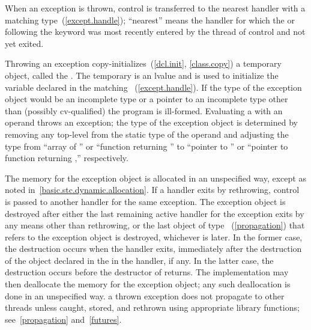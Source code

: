 \pnum
{}%
%
%
When an exception is thrown, control is transferred to the nearest handler with
a matching type~(\ref{except.handle}); ``nearest'' means the handler
for which the
 or
following the
keyword was most recently entered by the thread of control and not yet exited.

\pnum
Throwing an exception
copy-initializes~(\ref{dcl.init}, \ref{class.copy}) a temporary object,
called the
.
The temporary is an lvalue and is used to initialize the
variable declared in the matching
~(\ref{except.handle}).
If the type of the exception object would
be an incomplete type or a pointer to an incomplete
type other than (possibly cv-qualified)
 the program is ill-formed.
Evaluating a  with an operand throws an
exception; the type of the exception object is determined by removing
any top-level  from the static type of the
operand and adjusting the type from ``array of '' or ``function
returning '' to ``pointer to '' or ``pointer to function returning
,'' respectively.

\pnum
{}%
%
%
The memory for the exception object is
allocated in an unspecified way, except as noted in~\ref{basic.stc.dynamic.allocation}.
If a handler exits by rethrowing, control is passed to another handler for
the same exception.
The exception object is destroyed after either
the last remaining active handler for the exception exits by
any means other than
rethrowing, or the last object of type ~(\ref{propagation})
that refers to the exception object is destroyed, whichever is later. In the former
case, the destruction occurs when the handler exits, immediately after the destruction
of the object declared in the  in the handler, if any.
In the latter case, the destruction occurs before the destructor of 
returns.
The implementation may then
deallocate the memory for the exception object; any such deallocation
is done in an unspecified way.
\enternote a thrown exception does not
propagate to other threads unless caught, stored, and rethrown using
appropriate library functions; see~\ref{propagation} and~\ref{futures}. \exitnote

